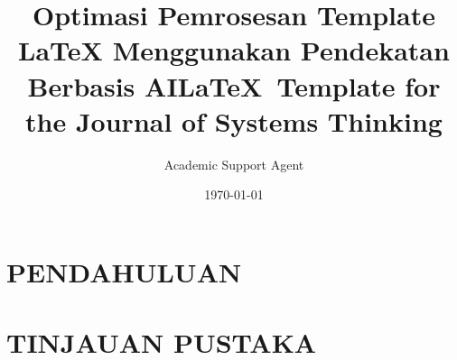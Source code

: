 \documentclass{tufte-handout}
\title{Optimasi Pemrosesan Template LaTeX Menggunakan Pendekatan Berbasis AI}
\author{Academic Support Agent}
\date{\today}
\begin{document}
\maketitle

\begin{abstract}

\end{abstract}

\chapter{PENDAHULUAN}


\chapter{TINJAUAN PUSTAKA}


\usepackage[T1]{fontenc}
\usepackage{babel}



\title[JOST \LaTeX\ Template] %
{\LaTeX\ Template for the Journal of Systems Thinking} %







\usepackage{graphicx} %
  \graphicspath{{graphics/}} %
\usepackage{amsmath}  %
\usepackage{booktabs} %
\usepackage{units}    %
\usepackage{multicol} %
\usepackage{lipsum}   %
\usepackage{fancyvrb} %
\end{document}

